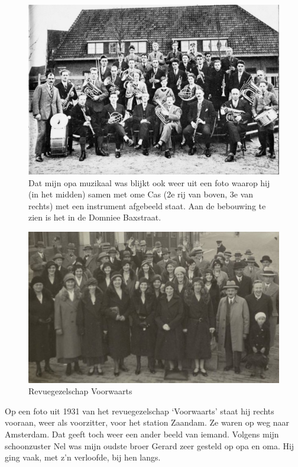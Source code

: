 \documentclass[10pt,twoside, openright]{memoir}
\begin{document}
\begin{figure}
\includegraphics[width=\textwidth]{img/ch2/ch2-afb04}
\caption*{\footnotesize Dat mijn opa muzikaal was blijkt ook weer uit een foto waarop hij (in het midden) samen met ome Cas (2e rij van boven, 3e van rechts) met een instrument afgebeeld staat. Aan de bebouwing te zien is het in de Domniee Baxstraat.}
\end{figure}

\begin{figure}
\includegraphics[width=\textwidth]{img/ch2/ch2-afb08}
\caption*{\footnotesize Revuegezelschap Voorwaarts}
\end{figure}

Op een foto uit 1931 van het revuegezelschap `Voorwaarts' staat hij rechts vooraan, weer als voorzitter, voor het station Zaandam. Ze waren op weg naar Amsterdam. Dat geeft toch weer een ander beeld van iemand. Volgens mijn schoonzuster Nel was mijn oudste broer Gerard zeer gesteld op opa en oma. Hij ging vaak, met z’n verloofde, bij hen langs. 
\end{document}
